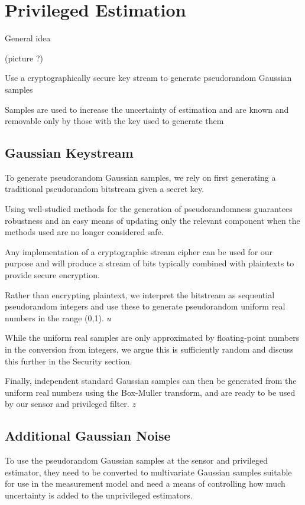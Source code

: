 \documentclass[conference]{IEEEtran}
\theoremstyle{definition}
\theoremstyle{definition}
\theoremstyle{remark}
\begin{document}
\section{Privileged Estimation}
General idea

(picture ?)

Use a cryptographically secure key stream to generate pseudorandom Gaussian samples

Samples are used to increase the uncertainty of estimation and are known and removable only by those with the key used to generate them

\subsection{Gaussian Keystream}
To generate pseudorandom Gaussian samples, we rely on first generating a traditional pseudorandom bitstream given a secret key.

Using well-studied methods for the generation of pseudorandomness guarantees robustness and an easy means of updating only the relevant component when the methods used are no longer considered safe.

Any implementation of a cryptographic stream cipher can be used for our purpose and will produce a stream of bits typically combined with plaintexts to provide secure encryption.

Rather than encrypting plaintext, we interpret the bitstream as sequential pseudorandom integers and use these to generate pseudorandom uniform real numbers in the range (0,1). $u$

While the uniform real samples are only approximated by floating-point numbers in the conversion from integers, we argue this is sufficiently random and discuss this further in the Security section.

Finally, independent standard Gaussian samples can then be generated from the uniform real numbers using the Box-Muller transform, and are ready to be used by our sensor and privileged filter. $z$

\subsection{Additional Gaussian Noise}
To use the pseudorandom Gaussian samples at the sensor and privileged estimator, they need to be converted to multivariate Gaussian samples suitable for use in the measurement model and need a means of controlling how much uncertainty is added to the unprivileged estimators.
\end{document}
